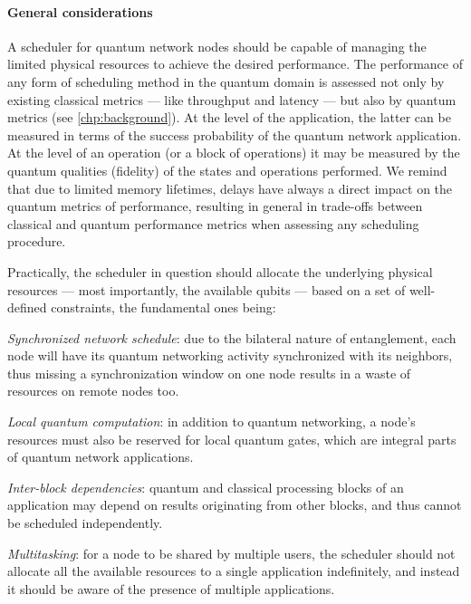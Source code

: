 \paragraph{General considerations}

A scheduler for quantum network nodes should be capable of managing the limited physical resources
to achieve the desired performance. The performance of any form of scheduling method in the quantum
domain is assessed not only by existing classical metrics --- like throughput and latency --- but
also by quantum metrics (see \cref{chp:background}). At the level of the application, the latter can
be measured in terms of the success probability of the quantum network application. At the level of
an operation (or a block of operations) it may be measured by the quantum qualities (fidelity) of
the states and operations performed. We remind that due to limited memory lifetimes, delays have
always a direct impact on the quantum metrics of performance, resulting in general in trade-offs
between classical and quantum performance metrics when assessing any scheduling procedure.

Practically, the scheduler in question should allocate the underlying physical resources --- most
importantly, the available qubits --- based on a set of well-defined constraints, the fundamental
ones being:
%
\begin{enumerate*}[label=(\arabic*)]
    \item \emph{Synchronized network schedule}: due to the bilateral nature of entanglement, each
          node will have its quantum networking activity synchronized with its neighbors, thus
          missing a synchronization window on one node results in a waste of resources on remote
          nodes too.
    \item \emph{Local quantum computation}: in addition to quantum networking, a node's resources
          must also be reserved for local quantum gates, which are integral parts of quantum network
          applications.
    \item \emph{Inter-block dependencies}: quantum and classical processing blocks of an application
          may depend on results originating from other blocks, and thus cannot be scheduled
          independently.
    \item \emph{Multitasking}: for a node to be shared by multiple users, the scheduler should not
          allocate all the available resources to a single application indefinitely, and instead it
          should be aware of the presence of multiple applications.
\end{enumerate*}

